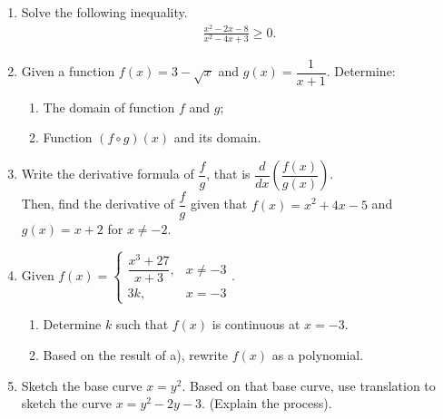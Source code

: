 \documentclass[10pt,openany,a4paper]{article}
\theoremstyle{definition}
\theoremstyle{definition}
\theoremstyle{plain}
\begin{document}
\newpage

\begin{enumerate}
    \item Solve the following inequality.
    \begin{align*}
        \frac{x^2-2x-8}{x^2-4x+3}\geq 0.
    \end{align*}

    \item Given a function $f(x)=3-\sqrt{x}$ and $g(x)=\dfrac{1}{x+1}$. Determine:
    \begin{enumerate}
        \item[a)] The domain of function $f$ and $g$;
        \item[b)] Function $(f\circ g)(x)$ and its domain.
    \end{enumerate}

    \item Write the derivative formula of $\dfrac{f}{g}$, that is $\dfrac{d}{dx}\left(\dfrac{f(x)}{g(x)}\right)$.\\
    Then, find the derivative of $\dfrac{f}{g}$ given that $f(x)=x^2+4x-5$ and $g(x)=x+2$ for $x\neq -2$.

    \item Given $f(x)=\begin{cases}
        \dfrac{x^3+27}{x+3}, & x\neq -3\\
        3k, & x=-3
    \end{cases}$.
    \begin{enumerate}
        \item[a.] Determine $k$ such that $f(x)$ is continuous at $x=-3$.
        \item[b.] Based on the result of a), rewrite $f(x)$ as a polynomial.
    \end{enumerate}

    \item Sketch the base curve $x=y^2$. Based on that base curve, use translation to sketch the curve $x=y^2-2y-3$. (Explain the process).
\end{enumerate}

\newpage
\end{document}
